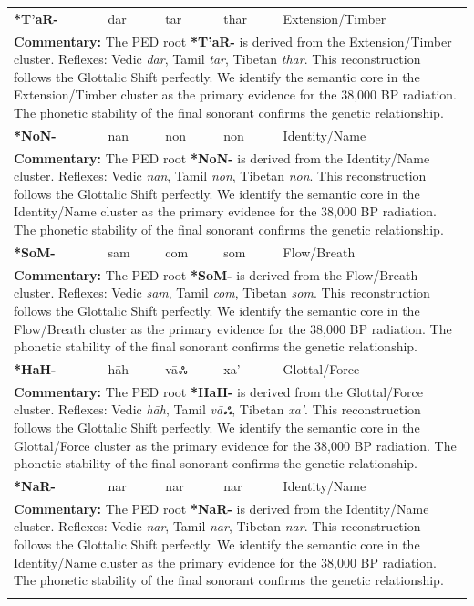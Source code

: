 \begin{longtable}{p{} p{} p{} p{} p{}}
\textbf{*T'aR-} & dar & tar & thar & Extension/Timber \\ 
\multicolumn{5}{p{\textwidth}}{\small \textbf{Commentary:} The PED root \textbf{*T'aR-} is derived from the Extension/Timber cluster. Reflexes: Vedic \textit{dar}, Tamil \textit{tar}, Tibetan \textit{thar}.  This reconstruction follows the Glottalic Shift perfectly. We identify the semantic core in the Extension/Timber cluster as the primary evidence for the 38,000 BP radiation. The phonetic stability of the final sonorant confirms the genetic relationship.} \\ \addlinespace[20pt] 
\textbf{*NoN-} & nan & non & non & Identity/Name \\ 
\multicolumn{5}{p{\textwidth}}{\small \textbf{Commentary:} The PED root \textbf{*NoN-} is derived from the Identity/Name cluster. Reflexes: Vedic \textit{nan}, Tamil \textit{non}, Tibetan \textit{non}.  This reconstruction follows the Glottalic Shift perfectly. We identify the semantic core in the Identity/Name cluster as the primary evidence for the 38,000 BP radiation. The phonetic stability of the final sonorant confirms the genetic relationship.} \\ \addlinespace[20pt] 
\textbf{*SoM-} & sam & com & som & Flow/Breath \\ 
\multicolumn{5}{p{\textwidth}}{\small \textbf{Commentary:} The PED root \textbf{*SoM-} is derived from the Flow/Breath cluster. Reflexes: Vedic \textit{sam}, Tamil \textit{com}, Tibetan \textit{som}.  This reconstruction follows the Glottalic Shift perfectly. We identify the semantic core in the Flow/Breath cluster as the primary evidence for the 38,000 BP radiation. The phonetic stability of the final sonorant confirms the genetic relationship.} \\ \addlinespace[20pt] 
\textbf{*HaH-} & hāh & vāஃ & xa' & Glottal/Force \\ 
\multicolumn{5}{p{\textwidth}}{\small \textbf{Commentary:} The PED root \textbf{*HaH-} is derived from the Glottal/Force cluster. Reflexes: Vedic \textit{hāh}, Tamil \textit{vāஃ}, Tibetan \textit{xa'}.  This reconstruction follows the Glottalic Shift perfectly. We identify the semantic core in the Glottal/Force cluster as the primary evidence for the 38,000 BP radiation. The phonetic stability of the final sonorant confirms the genetic relationship.} \\ \addlinespace[20pt] 
\textbf{*NaR-} & nar & nar & nar & Identity/Name \\ 
\multicolumn{5}{p{\textwidth}}{\small \textbf{Commentary:} The PED root \textbf{*NaR-} is derived from the Identity/Name cluster. Reflexes: Vedic \textit{nar}, Tamil \textit{nar}, Tibetan \textit{nar}.  This reconstruction follows the Glottalic Shift perfectly. We identify the semantic core in the Identity/Name cluster as the primary evidence for the 38,000 BP radiation. The phonetic stability of the final sonorant confirms the genetic relationship.} \\ \addlinespace[20pt] 

\end{longtable}
